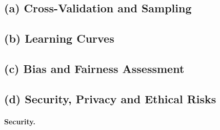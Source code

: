 \documentclass[manuscript,nonacm]{acmart} %
\begin{document}
\subsection{(a) Cross-Validation and Sampling}
\label{sec:cv}


\subsection{(b) Learning Curves}
\label{sec:lc}


\subsection{(c) Bias and Fairness Assessment}
\label{sec:fairness}

\subsection{(d) Security, Privacy and Ethical Risks}
\label{sec:risks}

\paragraph{Security.}
\end{document}
